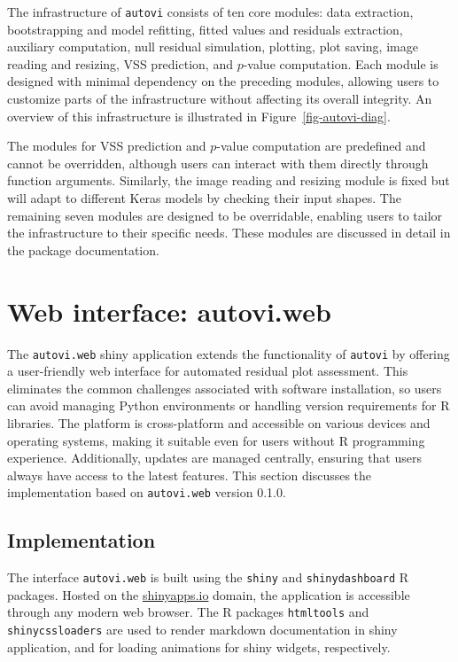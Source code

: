 \documentclass[
doublespace,
  times]{anzsauth}
\begin{document}
The infrastructure of \texttt{autovi} consists of ten core modules: data
extraction, bootstrapping and model refitting, fitted values and
residuals extraction, auxiliary computation, null residual simulation,
plotting, plot saving, image reading and resizing, VSS prediction, and
\(p\)-value computation. Each module is designed with minimal dependency
on the preceding modules, allowing users to customize parts of the
infrastructure without affecting its overall integrity. An overview of
this infrastructure is illustrated in Figure~\ref{fig-autovi-diag}.

The modules for VSS prediction and \(p\)-value computation are
predefined and cannot be overridden, although users can interact with
them directly through function arguments. Similarly, the image reading
and resizing module is fixed but will adapt to different Keras models by
checking their input shapes. The remaining seven modules are designed to
be overridable, enabling users to tailor the infrastructure to their
specific needs. These modules are discussed in detail in the package
documentation.

\section{Web interface: autovi.web}\label{sec-autovi-web}

The \texttt{autovi.web} shiny application extends the functionality of
\texttt{autovi} by offering a user-friendly web interface for automated
residual plot assessment. This eliminates the common challenges
associated with software installation, so users can avoid managing
Python environments or handling version requirements for R libraries.
The platform is cross-platform and accessible on various devices and
operating systems, making it suitable even for users without R
programming experience. Additionally, updates are managed centrally,
ensuring that users always have access to the latest features. This
section discusses the implementation based on \texttt{autovi.web}
version 0.1.0.

\subsection{Implementation}\label{implementation}

The interface \texttt{autovi.web} is built using the \texttt{shiny}
\citep{shiny} and \texttt{shinydashboard} \citep{shinydashboard} R
packages. Hosted on the \href{https://www.shinyapps.io}{shinyapps.io}
domain, the application is accessible through any modern web browser.
The R packages \texttt{htmltools} \citep{htmltools} and
\texttt{shinycssloaders} \citep{shinycssloaders} are used to render
markdown documentation in shiny application, and for loading animations
for shiny widgets, respectively.
\end{document}
